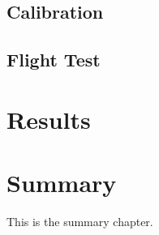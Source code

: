 \documentclass[12pt]{ucthesis}
\begin{document}
\section{Calibration}
\label{calibration}

\section{Flight Test}
\label{flight-test}


\chapter{Results}
\label{results}

\chapter{Summary}
\label{summary}
This is the summary chapter.


\clearpage



\end{document}
